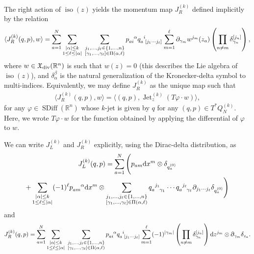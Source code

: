 \documentclass[12pt]{amsart}
\newcommand{\R}{\ensuremath{\mathbb{R}}}
\newcommand{\dx}{\ensuremath{\textrm{d}x}}
\newcommand{\dz}{\ensuremath{\textrm{d}z}}
\DeclareMathOperator{\SDiff}{SDiff}
\DeclareMathOperator{\Jet}{Jet}
\DeclareMathOperator{\iso}{iso}
\begin{document}
  The right action of $\iso(z)$ yields the momentum map $J_R^{(k)}$ defined implicitly by the relation
  \begin{equation*}
    \langle J_R^{(k)}(q,p) , w \rangle = \sum_{a=1}^N
    \sum_{\substack{ |\alpha| \leq k \\ 1 \leq \ell \leq |\alpha| }} \;
		\sum_{
			\substack{
				j_1,\dots,j_\ell \in \{1,\dots,n\} \\
				[\gamma_1,\dots,\gamma_\ell] \in \Pi(\alpha,\ell)
				}
			}
			p\indices{_a_i^\alpha} q\indices{_a^{i}_{[j_1 \cdots j_\ell]}}
      \sum_{m=1}^\ell  \partial_{\gamma_m} w^{j_m}(z_a) \left( \prod_{n \neq m}  \delta_{\gamma_n}^{[j_n]} \right),
  \end{equation*}
  where $w \in \mathfrak{X}_{\rm div}(\R^n)$ is such that $w(z) = 0$ (this describes the Lie algebra of $\iso(z)$),
  and $\delta_\alpha^\beta$ is the natural generalization of the Kronecker-delta symbol to multi-indices.
  Equivalently, we may define $J_R^{(k)}$
  as the unique map such that
 \begin{align}
  \langle J_R^{(k)}(q,p) , w \rangle = \langle (q,p) , \Jet_z^{(k)}( T\varphi \cdot w) \rangle, \label{Moma_right}
   \end{align}
  for any $\varphi \in \SDiff(\R^n)$ whose $k$-jet is given by $q$ for any $(q,p) \in T^*Q^{(k)}_N$. Here, we wrote $T\varphi \cdot w$ for the function obtained by applying the differential of $\varphi$ to $w$.
  
  We can write $J_L^{(k)}$ and $J_R^{(k)}$ explicitly, using the Dirac-delta distribution, as
  \begin{multline*}\label{eq:JLk}
    J_L^{(k)}(q,p) =
    \sum_{a=1}^N \Bigg(
    p_{am} \dx^m \otimes \delta_{q^{(0)}_a} \\
  + \sum_{\substack{ |\alpha| \leq k \\ 1 \leq \ell \leq |\alpha| }}
    (-1)^\ell p\indices{_{am}^\alpha} \dx^m \otimes
      \sum_{\substack{
          j_1,\dots,j_\ell \in \{1,\dots,n\} \\
          [\gamma_1,\dots,\gamma_\ell] \in \Pi( \alpha,\ell)
          }
        }
      q\indices{_a^{j_1}_{\gamma_1}} \cdots q\indices{_a^{j_\ell}_{\gamma_\ell}}
      \partial_{j_1 \cdots j_\ell} \delta_{q^{(0)}_a}
      \Bigg)
  \end{multline*}
  and
  \begin{equation}\label{eq:JRk}
    J_R^{(k)}(q,p) = \sum_{a=1}^{N}
    \sum_{\substack{ |\alpha| \leq k \\ 1 \leq \ell \leq |\alpha| }} \;
		\sum_{
			\substack{
				j_1,\dots,j_\ell \in \{1,\dots,n\} \\
				[\gamma_1,\dots,\gamma_\ell] \in \Pi(\alpha,\ell)
				}
			}
			p\indices{_a_i^\alpha} q\indices{_a^i_{[j_1 \cdots j_\ell]}}
      \sum_{m=1}^\ell (-1)^{|\gamma_m|}\left( \prod_{n \neq m}  \delta_{\gamma_n}^{[j_n]} \right) \dz^{j_m} \otimes \partial_{\gamma_m}\delta_{z_a}.
  \end{equation}
\end{document}

